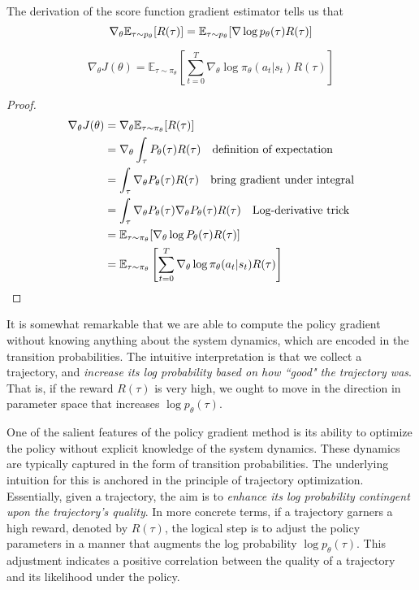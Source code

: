 The derivation of the score function gradient estimator tells  us that
$$
\nabla_{\theta} \mathbb E_{\tau \sim p_{\theta}} [R(\tau)] = \mathbb E_{\tau \sim p_{\theta}} [\nabla \log p_{\theta}(\tau) R(\tau)]
$$

\begin{proposition} 
    \begin{equation}
    \nabla_{\theta} J(\theta) = \mathbb{E}_{\tau \sim \pi_\theta} \left[\sum_{t=0}^{T} \nabla_{\theta} \log \pi_{\theta}(a_t|s_t) R(\tau)
    \right]
    \end{equation}
\end{proposition}
\begin{proof}
    \begin{align*}
        \nabla_{\theta} J(\theta) &= \nabla_{\theta} \mathbb E_{\tau \sim \pi_{\theta}}[R(\tau)] \\
        &= \nabla_{\theta} \int_{\tau} P_{\theta}(\tau) R(\tau) \quad \text{definition of expectation} \\
        &= \int_{\tau} \nabla_{\theta} P_{\theta}(\tau) R(\tau) \quad \text{bring gradient under integral} \\
        &= \int_{\tau} \nabla_{\theta} P_{\theta}(\tau) \nabla_{\theta} P_{\theta}(\tau) R(\tau)  \quad \text{Log-derivative trick} \\ 
        & = \mathbb E_{\tau \sim \pi_{\theta}} [\nabla_{\theta} \log  P_{\theta}(\tau) R(\tau)] \\
        & = \mathbb{E}_{\tau \sim \pi_\theta} \left[\sum_{t=0}^{T} \nabla_{\theta} \log \pi_{\theta}(a_t|s_t) R(\tau) \right]
    \end{align*}
\end{proof}

It is somewhat remarkable that we are able to compute the policy gradient without knowing anything about the system dynamics, which are encoded in the transition probabilities. The intuitive interpretation is that we collect a trajectory, and \textit{increase its log probability based on how ``good" the trajectory was}. That is, if the reward  $R(\tau)$ is very high, we ought to move in the direction in parameter space that increases $\log p_{\theta}(\tau)$.

One of the salient features of the policy gradient method is its ability to optimize the policy without explicit knowledge of the system dynamics. These dynamics are typically captured in the form of transition probabilities. The underlying intuition for this is anchored in the principle of trajectory optimization. Essentially, given a trajectory, the aim is to \textit{enhance its log probability contingent upon the trajectory's quality}. In more concrete terms, if a trajectory garners a high reward, denoted by $R(\tau)$, the logical step is to adjust the policy parameters in a manner that augments the log probability $\log p_{\theta}(\tau)$. This adjustment indicates a positive correlation between the quality of a trajectory and its likelihood under the policy.

